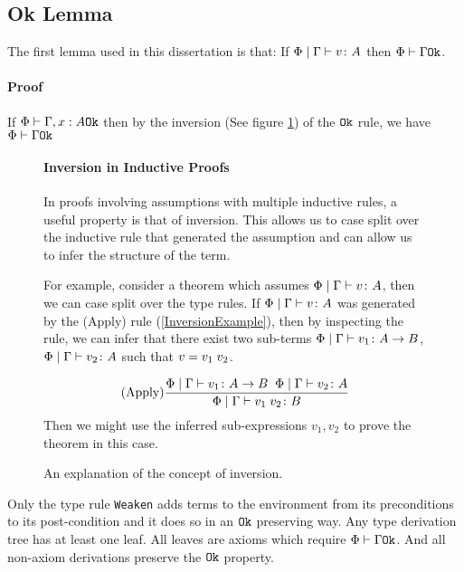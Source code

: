 \documentclass{Report}
\begin{document}
\subsection{Ok Lemma} The first lemma used in this dissertation is that: If $\Phi\mid\Gamma \vdash v \colon A$ then $\Phi\vdash \Gamma \texttt{Ok}$.
\paragraph{Proof}
If $\Phi\vdash \Gamma, x: A \texttt{Ok}$ then by the inversion (See figure \ref{InversionPrinciple}) of the $\texttt{Ok}$ rule, we have $\Phi\vdash \Gamma \texttt{Ok}$ 

\begin{figure}
    \begin{framed}
        \paragraph{Inversion in Inductive Proofs}

        In proofs involving assumptions with multiple inductive rules, a useful property is that of inversion. This allows us to case split over the inductive rule that generated the assumption and can allow us to infer the structure of the term.

        For example, consider a theorem which assumes $\Phi\mid\Gamma \vdash v \colon A$, then we can case split over the type rules. If $\Phi\mid\Gamma \vdash v \colon A$ was generated by the (Apply) rule (\ref{InversionExample}), then by inspecting the rule, we can infer that there exist two sub-terms $\Phi\mid\Gamma \vdash v_1 \colon A\rightarrow B$, $\Phi\mid\Gamma \vdash v_2 \colon A$ such that $v = v_1\; v_2$. 

        \begin{equation}\label{InversionExample}
            (\text{Apply}) \frac{\Phi\mid\Gamma \vdash v_1 \colon A\rightarrow B\;\;\Phi\mid\Gamma \vdash v_2 \colon A}{\Phi\mid\Gamma \vdash v_1\; v_2 \colon B}
        \end{equation}
        Then we might use the inferred sub-expressions $v_1, v_2$ to prove the theorem in this case.
    \end{framed}
    \caption{An explanation of the concept of inversion.}
    \label{InversionPrinciple}
\end{figure}


Only the type rule \texttt{Weaken} adds terms to the environment from its preconditions to its post-condition and it does so in an $\texttt{Ok}$ preserving way. Any type derivation tree has at least one leaf. All leaves are axioms which require $\Phi\vdash \Gamma \texttt{Ok}$. And all non-axiom derivations preserve the $\texttt{Ok}$ property.
\end{document}
